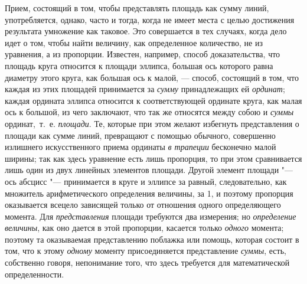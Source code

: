 {Прием, состоящий в том, чтобы представлять площадь как сумму линий,
употребляется, однако, часто и тогда, когда не имеет места с целью
достижения результата умножение как таковое. Это совершается в тех случаях,
когда дело идет о том, чтобы найти величину, как определенное количество,
не из уравнения, а из пропорции. Известен, например, способ доказательства,
что площадь круга относится к площади эллипса, большая ось которого равна
диаметру этого круга, как большая ось к малой, — способ, состоящий в том,
что каждая из этих площадей принимается за {\em сумму}
принадлежащих ей {\em ординат}; каждая ордината эллипса
относится к соответствующей ординате круга, как малая ось к большой, из
чего заключают, что так же относятся между собою и
{\em суммы} ординат,~т.~е.
{\em площади}. Те, которые при этом желают избегнуть
представления о площади как сумме линий, превращают с помощью обычного,
совершенно излишнего искусственного приема ординаты
{\em в трапеции} бесконечно малой ширины; так как здесь
уравнение есть лишь пропорция, то при этом сравнивается лишь один из двух
линейных элементов площади. Другой элемент площади "--- ось абсцисс
"--- принимается в круге и эллипсе за равный, следовательно, как множитель
арифметического определения величины, за 1, и поэтому пропорция оказывается
всецело зависящей только от отношения одного определяющего момента. Для
{\em представления} площади требуются два измерения; но
{\em определение величины}, как оно дается в этой
пропорции, касается только {\em одного} момента;
поэтому та оказываемая представлению поблажка или помощь, которая состоит в
том, что к этому {\em одному} моменту присоединяется
представление {\em суммы}, есть, собственно говоря,
непонимание того, что здесь требуется для математической определенности.

}
